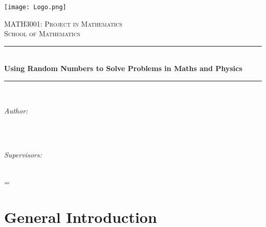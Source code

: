 \documentclass[a4paper]{article}
\begin{document}

\begin{titlepage}

\raggedleft
\texttt{[image: Logo.png]}\\

\vspace{3cm}
\begin{center}
\newcommand{\HRule}{\rule{\linewidth}{0.5mm}}
\textsc{\Large MATH3001: Project in Mathematics}\\[2.0mm]
\textsc{\Large School of Mathematics}\\[2.0mm]
\vspace{0.5cm}

	\HRule\\[0.4cm]

	{\huge\bfseries Using Random Numbers to Solve Problems in Maths and Physics}\\[0.4cm] 

	\HRule\\[1.5cm]

		\begin{minipage}{0.4\textwidth}
		\begin{flushleft}
			\large
			\textit{Author:}\\
			 \\
		\end{flushleft}
	\end{minipage}
	~
	\begin{minipage}{0.4\textwidth}
		\begin{flushright}
			\large
			\textit{Supervisors:}\\
			 \\
		\end{flushright}
	\end{minipage}
\mbox{}
\vfill
{}

\end{center}
\end{titlepage}


\tableofcontents

\newpage
\parskip = \baselineskip
\section{General Introduction}
\end{document}
